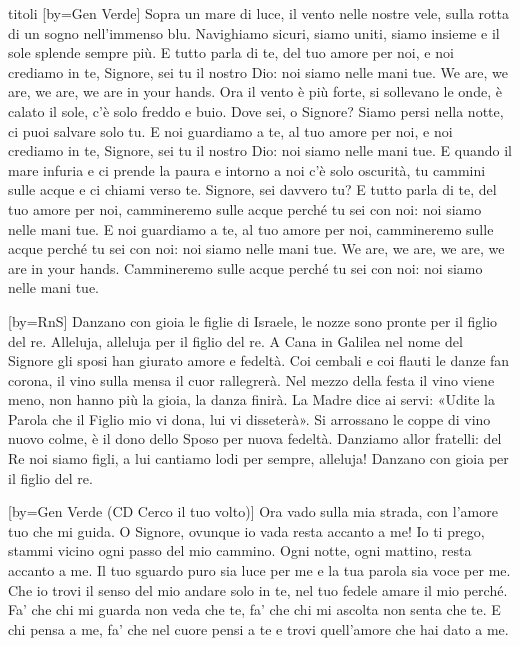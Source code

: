 \begin{songs}{titoli}
[by={Gen Verde}]
\beginverse
Sopra un mare di luce,
il vento nelle nostre vele,
sulla rotta di un sogno
nell'immenso blu.
Navighiamo sicuri,
siamo uniti, siamo insieme
e il sole splende sempre più.
\endverse
\beginchorus
E tutto parla di te,
del tuo amore per noi,
e noi crediamo in te, Signore,
sei tu il nostro Dio:
noi siamo nelle mani tue.
\endchorus
\beginverse*
We are, we are, we are,
we are in your hands. 
\endverse
\beginverse
Ora il vento è più forte,
si sollevano le onde,
è calato il sole,
c'è solo freddo e buio.
Dove sei, o Signore?
Siamo persi nella notte,
ci puoi salvare solo tu.
\endverse
\beginchorus
E noi guardiamo a te,
al tuo amore per noi,
e noi crediamo in te, Signore,
sei tu il nostro Dio:
noi siamo nelle mani tue.
\endchorus
\beginverse
E quando il mare infuria
e ci prende la paura
e intorno a noi c'è solo oscurità,
tu cammini sulle acque
e ci chiami verso te.
Signore, sei davvero tu? 
\endverse
\beginchorus
E tutto parla di te,
del tuo amore per noi,
cammineremo sulle acque
perché tu sei con noi:
noi siamo nelle mani tue.
E noi guardiamo a te,
al tuo amore per noi,
cammineremo sulle acque
perché tu sei con noi:
noi siamo nelle mani tue.
\endchorus
\beginverse*
We are, we are, we are,
we are in your hands. 
\endverse
\beginverse*
Cammineremo sulle acque
perché tu sei con noi:
noi siamo nelle mani tue. 
\endverse
\endsong

[by={RnS}]
\beginchorus
Danzano con gioia le figlie di Israele,
le nozze sono pronte per il figlio del re.
Alleluja, alleluja per il figlio del re. 
\endchorus
\beginverse
A Cana in Galilea nel nome del Signore
gli sposi han giurato amore e fedeltà.
Coi cembali e coi flauti le danze fan corona,
il vino sulla mensa il cuor rallegrerà.
\endverse
\beginverse
Nel mezzo della festa il vino viene meno,
non hanno più la gioia, la danza finirà.
La Madre dice ai servi: «Udite la Parola
che il Figlio mio vi dona, lui vi disseterà».
\endverse
\beginverse
Si arrossano le coppe di vino nuovo colme,
è il dono dello Sposo per nuova fedeltà.
Danziamo allor fratelli: del Re noi siamo figli,
a lui cantiamo lodi per sempre, alleluja!
\endverse
\beginverse*
Danzano con gioia per il figlio del re. 
\endverse
\endsong

[by={Gen Verde (CD Cerco il tuo volto)}]
\beginchorus
Ora vado sulla mia strada, con l'amore tuo che mi guida.
O Signore, ovunque io vada resta accanto a me!
Io ti prego, stammi vicino ogni passo del mio cammino.
Ogni notte, ogni mattino, resta accanto a me.
\endchorus
\beginverse
Il tuo sguardo puro sia luce per me
e la tua parola sia voce per me.
Che io trovi il senso del mio andare solo in te,
nel tuo fedele amare il mio perché.
\endverse
\beginverse
Fa' che chi mi guarda non veda che te,
fa' che chi mi ascolta non senta che te.
E chi pensa a me, fa' che nel cuore pensi a te
e trovi quell'amore che hai dato a me.
\endverse
\endsong


\end{songs}
